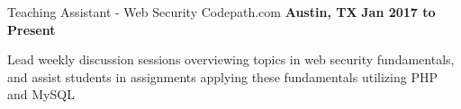 \begin{cventries}
	\cventry
		{\normalsize Teaching Assistant - Web Security}
		{\large Codepath.com}
		{\normalsize \textbf{Austin, TX}}
		{\normalsize \textbf{Jan 2017 to Present}}
		{
			\begin{cvitems}
				\item {\normalsize Lead weekly discussion sessions overviewing topics in web security fundamentals, and assist students in assignments applying these fundamentals utilizing PHP and MySQL}
			\end{cvitems}
		}
\end{cventries}
